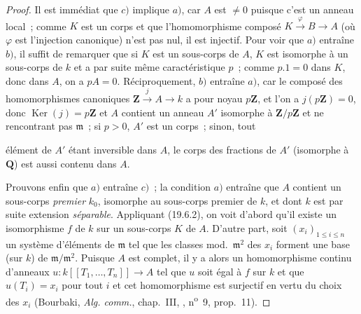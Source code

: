\begin{proof}
Il est immédiat que $c)$ implique $a)$, car $A$ est $\neq0$ puisque c'est un
anneau local~; comme $K$ est un corps et que l'homomorphisme composé
$K\xrightarrow{\varphi}B\to A$ (où $\varphi$ est l'injection canonique) n'est
pas nul, il est injectif. Pour voir que $a)$ entraîne $b)$, il suffit de
remarquer que si $K$ est un sous-corps de $A$, $K$ est isomorphe à un
sous-corps de $k$ et a par suite même caractéristique $p$~; comme $p.1=0$ dans
$K$, donc dans $A$, on a $pA=0$. Réciproquement, $b)$ entraîne $a)$, car le
composé des homomorphismes canoniques
$\mathbf Z\xrightarrow{j}A\to k$ a pour noyau $p\mathbf Z$, et l'on a
$j(p\mathbf Z)=0$, donc $\operatorname{Ker}(j)=p\mathbf Z$ et $A$ contient un
anneau $A'$ isomorphe à $\mathbf Z/p\mathbf Z$ et ne rencontrant pas
$\mathfrak m$~; si $p>0$, $A'$ est un corps~; sinon, tout


élément de $A'$ étant inversible dans $A$, le corps des fractions de $A'$
(isomorphe à $\mathbf Q$) est aussi contenu dans $A$.

Prouvons enfin que $a)$ entraîne $c)$~; la condition $a)$ entraîne que $A$
contient un sous-corps \emph{premier} $k_0$, isomorphe au sous-corps premier de $k$,
et dont $k$ est par suite extension \emph{séparable}. Appliquant (19.6.2), on voit
d'abord qu'il existe un isomorphisme $f$ de $k$ sur un sous-corps $K$ de $A$.
D'autre part, soit $(x_i)_{1\leq i\leq n}$ un système d'éléments de
$\mathfrak m$ tel que les classes mod.~$\mathfrak m^2$ des $x_i$ forment une
base (sur $k$) de $\mathfrak m/\mathfrak m^2$. Puisque $A$ est complet, il y a
alors un homomorphisme continu d'anneaux
$u:k[[T_1,\ldots,T_n]]\to A$ tel que $u$ soit égal à $f$ sur $k$ et que
$u(T_i)=x_i$ pour tout $i$ et cet homomorphisme est surjectif en vertu du
choix des $x_i$ (Bourbaki, \emph{Alg. comm.}, chap.~III, ,
n\textsuperscript{o}~9, prop.~11).
\end{proof}

